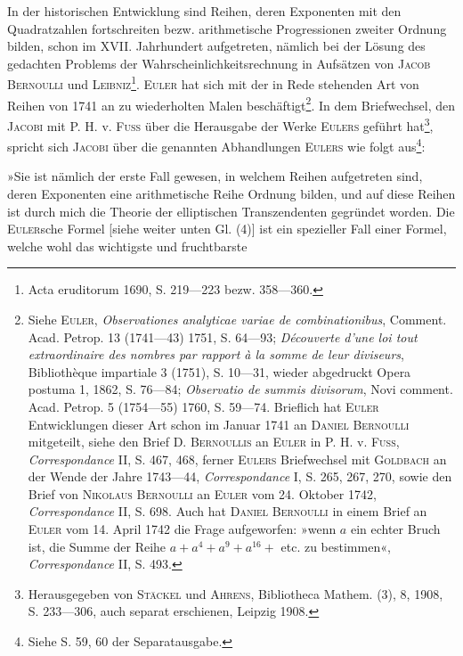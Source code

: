 In der historischen Entwicklung sind Reihen, deren Exponenten mit den
Quadratzahlen fortschreiten bezw. arithmetische Progressionen zweiter Ordnung
bilden, schon im XVII. Jahrhundert aufgetreten, nämlich bei der Lösung
des gedachten Problems der Wahrscheinlichkeitsrechnung in Aufsätzen von
\textsc{Jacob Bernoulli} und \textsc{Leibniz}\footnote{Acta eruditorum 1690, S. 219—223 bezw. 358—360.}. \textsc{Euler} hat sich mit der in Rede stehenden
Art von Reihen von 1741 an zu wiederholten Malen beschäftigt\footnote{Siehe \textsc{Euler}, \textit{Observationes analyticae variae de combinationibus}, Comment. Acad. Petrop. 13 (1741—43) 1751, S. 64—93; \textit{Découverte d’une loi tout extraordinaire des nombres par rapport à la somme de leur diviseurs}, Bibliothèque impartiale 3 (1751), S. 10—31, wieder abgedruckt Opera postuma 1, 1862, S. 76—84; \textit{Observatio de summis divisorum}, Novi comment. Acad. Petrop. 5 (1754—55) 1760, S. 59—74. Brieflich hat \textsc{Euler} Entwicklungen dieser Art schon im Januar 1741 an \textsc{Daniel Bernoulli} mitgeteilt, siehe den Brief D. \textsc{Bernoullis} an \textsc{Euler} in P. H. v. \textsc{Fuss}, \textit{Correspondance} II, S. 467, 468, ferner \textsc{Eulers} Briefwechsel mit \textsc{Goldbach} an der Wende der Jahre 1743—44, \textit{Correspondance} I, S. 265, 267, 270, sowie den Brief von \textsc{Nikolaus Bernoulli} an \textsc{Euler} vom 24. Oktober 1742, \textit{Correspondance} II, S. 698. Auch hat \textsc{Daniel Bernoulli} in einem Brief an \textsc{Euler} vom 14. April 1742 die Frage aufgeworfen: »wenn \(a\) ein echter Bruch ist, die Summe der Reihe \(a+a^4+a^9+a^{16}+{}\) etc. zu bestimmen«, \textit{Correspondance} II, S. 493.}. In dem
Briefwechsel, den \textsc{Jacobi} mit P. H. v. \textsc{Fuss} über die Herausgabe der Werke
\textsc{Eulers} geführt hat\footnote{Herausgegeben von \textsc{Stäckel} und \textsc{Ahrens}, Bibliotheca Mathem. (3), 8, 1908, S. 233—306, auch separat erschienen, Leipzig 1908.}, spricht sich \textsc{Jacobi} über die genannten Abhandlungen
\textsc{Eulers} wie folgt aus\footnote{Siehe S. 59, 60 der Separatausgabe.}:\par
\clearpage{}
»Sie ist nämlich der erste Fall gewesen, in welchem Reihen aufgetreten
sind, deren Exponenten eine arithmetische Reihe  Ordnung bilden,
und auf diese Reihen ist durch mich die Theorie der elliptischen Transzendenten
gegründet worden. Die \textsc{Euler}sche Formel [siehe weiter unten Gl. (4)]
ist ein spezieller Fall einer Formel, welche wohl das wichtigste und fruchtbarste
